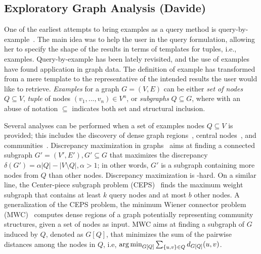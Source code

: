 \subsection{Exploratory Graph Analysis (Davide)} 


\noindent One of the earliest attempts to bring examples as a query method is query-by-example~\citep{zloof1975query}.
The main idea was to help the user in the query formulation, allowing her to specify the shape of the results in terms of templates for tuples, i.e., examples.
Query-by-example has been lately revisited, and the use of examples have found application in graph data. 
The definition of example has transformed from a mere template to the representative of the intended results the user would like to retrieve.
\emph{Examples} for a graph $G = (V,E)$ can be either \emph{set of nodes} $Q \subseteq V$, \emph{tuple} of nodes $(v_1, ..., v_n) \in V^n$, or \emph{subgraphs} $Q \subseteq G$, where with an abuse of notation $\subseteq$ indicates both set and structural inclusion. 

 Several analyses can be performed when a set of examples nodes $Q\subseteq V$ is provided; this includes the discovery of dense graph regions~\citep{gionis2015bump,ruchansky2015minimum}, central nodes~\citep{tong2006center}, and communities~\citep{staudt2014detecting,perozzi2014focused}.%
Discrepancy maximization in graphs~\citep{gionis2015bump} aims at finding a connected subgraph $G' = (V', E'), G' \subseteq G$ that maximizes the discrepancy $\delta(G'){=}\alpha|Q|{-}|V{\setminus}Q|, \alpha > 1$; in other words, $G'$ is a subgraph containing more nodes from $Q$ than other nodes. 
Discrepancy maximization is \NP-hard. 
On a similar line, the Center-piece subgraph problem (CEPS)~\citep{tong2006center} finds the maximum weight subgraph that contains at least $k$ query nodes and at most $b$ other nodes. 
A generalization of the CEPS problem, the minimum Wiener connector problem (MWC)~\citep{ruchansky2015minimum} computes dense regions of a graph potentially representing community structures, given a set of nodes as input. MWC aims at finding a subgraph of $G$ induced by $Q$, denoted as $G[Q]$, that minimizes the sum of the pairwise distances among the nodes in $Q$, i.e, $\operatorname*{\arg\min}_{G[Q]}\sum_{\{u,v\}{}\in{}Q}{}d_{G[Q]}(u,v)$. 

